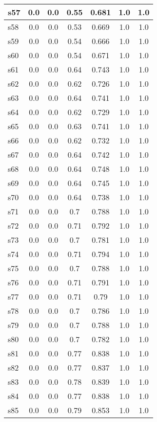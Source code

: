 \documentclass{article}
\begin{document}
\begin{tabular}{|l|c|c|c|c|c|c|}
\hline
s57 &0.0 & 0.0 & 0.55 & 0.681 & 1.0 & 1.0\\
\hline
s58 &0.0 & 0.0 & 0.53 & 0.669 & 1.0 & 1.0\\
\hline
s59 &0.0 & 0.0 & 0.54 & 0.666 & 1.0 & 1.0\\
\hline
s60 &0.0 & 0.0 & 0.54 & 0.671 & 1.0 & 1.0\\
\hline
s61 &0.0 & 0.0 & 0.64 & 0.743 & 1.0 & 1.0\\
\hline
s62 &0.0 & 0.0 & 0.62 & 0.726 & 1.0 & 1.0\\
\hline
s63 &0.0 & 0.0 & 0.64 & 0.741 & 1.0 & 1.0\\
\hline
s64 &0.0 & 0.0 & 0.62 & 0.729 & 1.0 & 1.0\\
\hline
s65 &0.0 & 0.0 & 0.63 & 0.741 & 1.0 & 1.0\\
\hline
s66 &0.0 & 0.0 & 0.62 & 0.732 & 1.0 & 1.0\\
\hline
s67 &0.0 & 0.0 & 0.64 & 0.742 & 1.0 & 1.0\\
\hline
s68 &0.0 & 0.0 & 0.64 & 0.748 & 1.0 & 1.0\\
\hline
s69 &0.0 & 0.0 & 0.64 & 0.745 & 1.0 & 1.0\\
\hline
s70 &0.0 & 0.0 & 0.64 & 0.738 & 1.0 & 1.0\\
\hline
s71 &0.0 & 0.0 & 0.7 & 0.788 & 1.0 & 1.0\\
\hline
s72 &0.0 & 0.0 & 0.71 & 0.792 & 1.0 & 1.0\\
\hline
s73 &0.0 & 0.0 & 0.7 & 0.781 & 1.0 & 1.0\\
\hline
s74 &0.0 & 0.0 & 0.71 & 0.794 & 1.0 & 1.0\\
\hline
s75 &0.0 & 0.0 & 0.7 & 0.788 & 1.0 & 1.0\\
\hline
s76 &0.0 & 0.0 & 0.71 & 0.791 & 1.0 & 1.0\\
\hline
s77 &0.0 & 0.0 & 0.71 & 0.79 & 1.0 & 1.0\\
\hline
s78 &0.0 & 0.0 & 0.7 & 0.786 & 1.0 & 1.0\\
\hline
s79 &0.0 & 0.0 & 0.7 & 0.788 & 1.0 & 1.0\\
\hline
s80 &0.0 & 0.0 & 0.7 & 0.782 & 1.0 & 1.0\\
\hline
s81 &0.0 & 0.0 & 0.77 & 0.838 & 1.0 & 1.0\\
\hline
s82 &0.0 & 0.0 & 0.77 & 0.837 & 1.0 & 1.0\\
\hline
s83 &0.0 & 0.0 & 0.78 & 0.839 & 1.0 & 1.0\\
\hline
s84 &0.0 & 0.0 & 0.77 & 0.838 & 1.0 & 1.0\\
\hline
s85 &0.0 & 0.0 & 0.79 & 0.853 & 1.0 & 1.0\\

\end{tabular}
\end{document}
